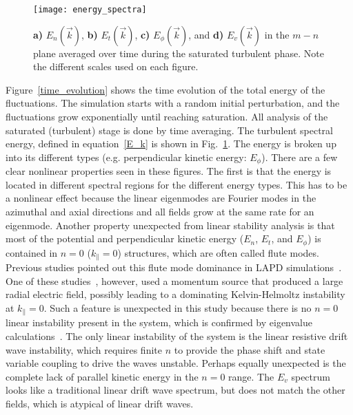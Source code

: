 \documentclass[showpacs,preprintnumbers,amsmath,amssymb,superscriptaddress]{revtex4}
\def\para{\parallel}
\begin{document}
\begin{figure}[!htbp]
\texttt{[image: energy\_spectra]}
\hfil
\caption{\textbf{a)} $E_n(\vec{k})$, \textbf{b)} $E_t(\vec{k})$, \textbf{c)} $E_\phi(\vec{k})$, and \textbf{d)} $E_v(\vec{k})$ in the $m-n$ plane averaged over time during the saturated turbulent phase.
Note the different scales used on each figure.}
\label{energy_figures}
\end{figure}

Figure~\ref{time_evolution} shows the time evolution of the total energy of the fluctuations. The simulation starts with a random initial perturbation, and the fluctuations grow
exponentially until reaching saturation. All analysis of the saturated (turbulent) stage is done by time averaging.
The turbulent spectral energy, defined in equation~\ref{E_k} is shown in Fig.~\ref{energy_figures}. The energy is broken up into its different types (e.g. perpendicular kinetic energy: $E_\phi$).
There are a few clear nonlinear properties
seen in these figures. The first is that the energy is located in different spectral regions for the different energy types. This has to be a nonlinear effect because the linear eigenmodes
are Fourier modes in the azimuthal and axial directions and all fields grow at the same rate for an eigenmode. 
Another property unexpected from linear stability analysis is that most of the potential and perpendicular kinetic energy ($E_n$, $E_t$, and $E_\phi$) is contained in $n=0$ ($k_\para = 0$) 
structures, which are often called flute modes. Previous studies pointed out this flute mode dominance in LAPD simulations~\cite{rogers2010,Umansky2011}. One of these studies~\cite{rogers2010},
however, used a momentum source that produced a large radial electric field, possibly leading to a dominating Kelvin-Helmoltz instability at $k_\para = 0$.
Such a feature is unexpected in this study because there is no $n=0$ linear instability present in the system, which is confirmed by eigenvalue calculations~\cite{Popovich2010a}.
The only linear instability of the system is the
linear resistive drift wave instability, which requires finite $n$ to provide the phase shift and state variable coupling to drive the waves unstable. Perhaps equally unexpected is the complete
lack of parallel kinetic energy in the $n=0$ range. The $E_v$ spectrum looks like a traditional linear drift wave spectrum, but does not match the other fields, which is atypical of
linear drift waves.

\end{document}
